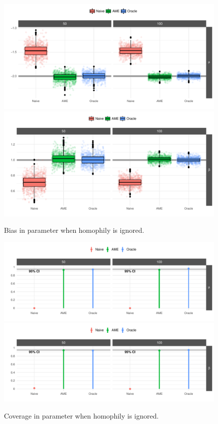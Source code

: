 \documentclass[12pt]{amsart}
\begin{document}
\begin{figure}
	\centering
	\caption{Bias in parameter when homophily is ignored.}
	\label{fig:ameBias}
	\includegraphics[width=1\textwidth]{ameSimBias_mu.pdf} \\
	\includegraphics[width=1\textwidth]{ameSimBias_beta.pdf}
\end{figure}

\begin{figure}
	\centering
	\caption{Coverage in parameter when homophily is ignored.}
	\label{fig:ameCalib}
	\includegraphics[width=1\textwidth]{ameSimCover_mu.pdf} \\
	\includegraphics[width=1\textwidth]{ameSimCover_beta.pdf}
\end{figure}
\end{document}
